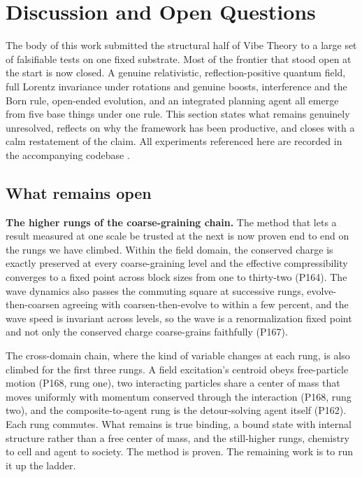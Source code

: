 \section{Discussion and Open Questions}

The body of this work submitted the structural half of Vibe Theory to a large set of falsifiable tests on one
fixed substrate. Most of the frontier that stood open at the start is now closed. A genuine relativistic,
reflection-positive quantum field, full Lorentz invariance under rotations and genuine boosts, interference
and the Born rule, open-ended evolution, and an integrated planning agent all emerge from five base things
under one rule. This section states what remains genuinely unresolved, reflects on why the framework has been
productive, and closes with a calm restatement of the claim. All experiments referenced here are recorded in
the accompanying codebase \cite{pollard2026vibetest}.

\subsection{What remains open}

\textbf{The higher rungs of the coarse-graining chain.} The method that lets a result measured at one scale be
trusted at the next is now proven end to end on the rungs we have climbed. Within the field domain, the
conserved charge is exactly preserved at every coarse-graining level and the effective compressibility
converges to a fixed point across block sizes from one to thirty-two (P164). The wave dynamics also passes the
commuting square at successive rungs, evolve-then-coarsen agreeing with coarsen-then-evolve to within a few
percent, and the wave speed is invariant across levels, so the wave is a renormalization fixed point and not
only the conserved charge coarse-grains faithfully (P167).

The cross-domain chain, where the kind of variable
changes at each rung, is also climbed for the first three rungs. A field excitation's centroid obeys
free-particle motion (P168, rung one), two interacting particles share a center of mass that moves uniformly
with momentum conserved through the interaction (P168, rung two), and the composite-to-agent rung is the
detour-solving agent itself (P162). Each rung commutes. What remains is true binding, a bound state with
internal structure rather than a free center of mass, and the still-higher rungs, chemistry to cell and agent
to society. The method is proven. The remaining work is to run it up the ladder.

